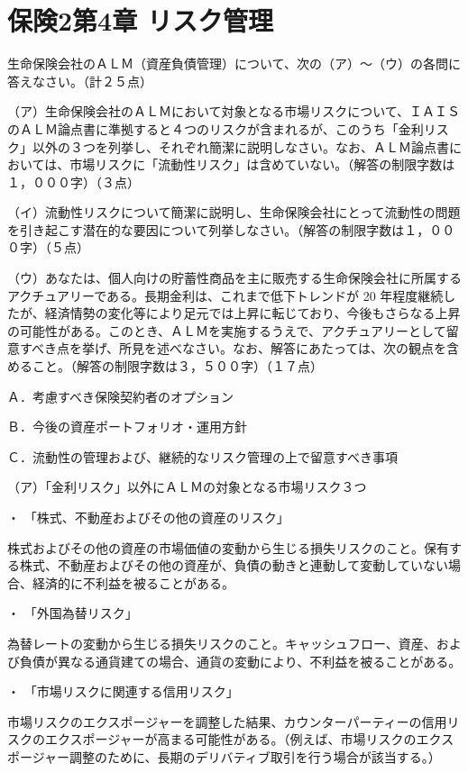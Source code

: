 \documentclass[report,gutter=10mm,fore-edge=10mm,uplatex,dvipdfmx]{jlreq}
\begin{document}
\chapter{保険2第4章 リスク管理}
生命保険会社のＡＬＭ（資産負債管理）について、次の（ア）～（ウ）の各問に答えなさい。（計２５点）

（ア）生命保険会社のＡＬＭにおいて対象となる市場リスクについて、ＩＡＩＳのＡＬＭ論点書に準拠すると４つのリスクが含まれるが、このうち「金利リスク」以外の３つを列挙し、それぞれ簡潔に説明しなさい。なお、ＡＬＭ論点書においては、市場リスクに「流動性リスク」は含めていない。（解答の制限字数は１，０００字）（３点）

（イ）流動性リスクについて簡潔に説明し、生命保険会社にとって流動性の問題を引き起こす潜在的な要因について列挙しなさい。（解答の制限字数は１，０００字）（５点）

（ウ）あなたは、個人向けの貯蓄性商品を主に販売する生命保険会社に所属するアクチュアリーである。長期金利は、これまで低下トレンドが 20 年程度継続したが、経済情勢の変化等により足元では上昇に転じており、今後もさらなる上昇の可能性がある。このとき、ＡＬＭを実施するうえで、アクチュアリーとして留意すべき点を挙げ、所見を述べなさい。なお、解答にあたっては、次の観点を含めること。（解答の制限字数は３，５００字）（１７点）

Ａ．考慮すべき保険契約者のオプション

Ｂ．今後の資産ポートフォリオ・運用方針

Ｃ．流動性の管理および、継続的なリスク管理の上で留意すべき事項

\answer{}
（ア）「金利リスク」以外にＡＬＭの対象となる市場リスク３つ 

・ 「株式、不動産およびその他の資産のリスク」

株式およびその他の資産の市場価値の変動から生じる損失リスクのこと。保有する株式、不動産およびその他の資産が、負債の動きと連動して変動していない場合、経済的に不利益を被ることがある。

・ 「外国為替リスク」

為替レートの変動から生じる損失リスクのこと。キャッシュフロー、資産、および負債が異なる通貨建ての場合、通貨の変動により、不利益を被ることがある。

・ 「市場リスクに関連する信用リスク」

市場リスクのエクスポージャーを調整した結果、カウンターパーティーの信用リスクのエクスポージャーが高まる可能性がある。（例えば、市場リスクのエクスポージャー調整のために、長期のデリバティブ取引を行う場合が該当する。）
\end{document}

